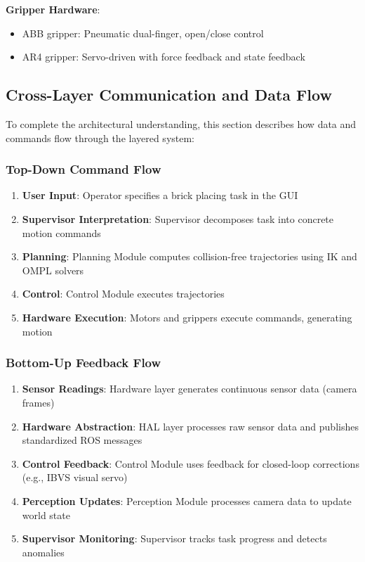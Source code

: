 \textbf{Gripper Hardware}:
\begin{itemize}
    \item ABB gripper: Pneumatic dual-finger, open/close control
    \item AR4 gripper: Servo-driven with force feedback and state feedback
\end{itemize}

\subsection{Cross-Layer Communication and Data Flow}
\label{subsec:cross_layer_communication}

To complete the architectural understanding, this section describes how data and commands flow through the layered system:

\subsubsection{Top-Down Command Flow}
\begin{enumerate}
    \item \textbf{User Input}: Operator specifies a brick placing task in the GUI
    \item \textbf{Supervisor Interpretation}: Supervisor decomposes task into concrete motion commands
    \item \textbf{Planning}: Planning Module computes collision-free trajectories using IK and OMPL solvers
    \item \textbf{Control}: Control Module executes trajectories
    \item \textbf{Hardware Execution}: Motors and grippers execute commands, generating motion
\end{enumerate}

\subsubsection{Bottom-Up Feedback Flow}
\begin{enumerate}
    \item \textbf{Sensor Readings}: Hardware layer generates continuous sensor data (camera frames)
    \item \textbf{Hardware Abstraction}: HAL layer processes raw sensor data and publishes standardized ROS messages
    \item \textbf{Control Feedback}: Control Module uses feedback for closed-loop corrections (e.g., IBVS visual servo)
    \item \textbf{Perception Updates}: Perception Module processes camera data to update world state
    \item \textbf{Supervisor Monitoring}: Supervisor tracks task progress and detects anomalies
\end{enumerate}

